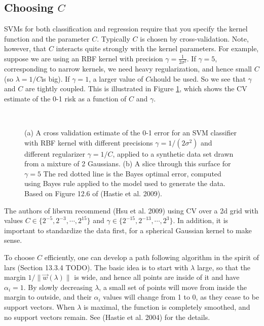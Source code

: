 \subsection{Choosing $C$}
\label{sec:SVM-Choosing-C}
SVMs for both classification and regression require that you specify the kernel function and the parameter $C$. Typically $C$ is chosen by cross-validation. Note, however, that $C$ interacts quite strongly with the kernel parameters. For example, suppose we are using an RBF kernel with precision $\gamma=\frac{1}{2\sigma^2}$. If $\gamma=5$, corresponding to narrow kernels, we need heavy regularization, and hence small $C$(so $\lambda=1/C$is big). If $\gamma=1$, a larger value of $C$should be used. So we see that $\gamma$ and $C$ are tightly coupled. This is illustrated in Figure \ref{fig:choosing-C}, which shows the CV estimate of the 0-1 risk as a function of $C$ and $\gamma$.

\begin{figure}[hbtp]
\centering
{} \\
\caption{(a) A cross validation estimate of the 0-1 error for an SVM classifier with RBF kernel with different precisions $\gamma=1/(2\sigma^2)$ and different regularizer $\gamma=1/C$, applied to a synthetic data set drawn from a mixture of 2 Gaussians. (b) A slice through this surface for $\gamma=5$ The red dotted line is the Bayes optimal error, computed using Bayes rule applied to the model used to generate the data. Based on Figure 12.6 of (Hastie et al. 2009). }
\label{fig:choosing-C} 
\end{figure}

The authors of libsvm recommend (Hsu et al. 2009) using CV over a 2d grid with values $C \in \{2^{−5},2^{−3},\cdots,2^{15}\}$ and $\gamma \in \{2^{−15},2^{−13},\cdots,2^3\}$. In addition, it is important to standardize the data first, for a spherical Gaussian kernel to make sense.

To choose $C$ efficiently, one can develop a path following algorithm in the spirit of lars (Section 13.3.4 TODO). The basic idea is to start with $\lambda$ large, so that the margin $1/\lVert\vec{w}(\lambda)\rVert$ is wide, and hence all points are inside of it and have $\alpha_i =1$. By slowly decreasing $\lambda$, a small set of points will move from inside the margin to outside, and their $\alpha_i$ values will change from 1 to 0, as they cease to be support vectors. When $\lambda$ is maximal, the function is completely smoothed, and no support vectors remain. See (Hastie et al. 2004) for the details.


